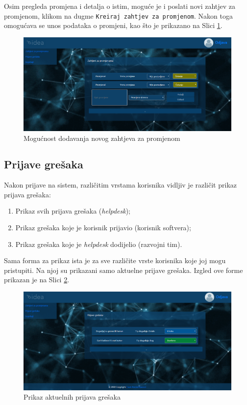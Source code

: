 \documentclass[12pt,a4paper]{article}
\begin{document}
Osim pregleda promjena i detalja o istim, moguće je i poslati novi zahtjev za promjenom, klikom na dugme \texttt{Kreiraj zahtjev za promjenom}. Nakon toga omogućava se unos podataka o promjeni, kao što je prikazano na Slici \ref{s10}.

\begin{figure}[H]
\center
\includegraphics[scale=0.35]{../res/UI/changeAdd.PNG}
\caption{Mogućnost dodavanja novog zahtjeva za promjenom}
\label{s10}
\end{figure}

\newpage

\subsection{Prijave grešaka}

Nakon prijave na sistem, različitim vrstama korisnika vidljiv je različit prikaz prijava grešaka:

\begin{enumerate}
\item Prikaz svih prijava grešaka (\textit{helpdesk});
\item Prikaz grešaka koje je korisnik prijavio (korisnik softvera);
\item Prikaz grešaka koje je \textit{helpdesk} dodijelio (razvojni tim).
\end{enumerate}

Sama forma za prikaz ista je za sve različite vrste korisnika koje joj mogu pristupiti. Na njoj su prikazani samo aktuelne prijave grešaka. Izgled ove forme prikazan je na Slici \ref{s11}.

\begin{figure}[H]
\center
\includegraphics[scale=0.35]{../res/UI/errorActual.PNG}
\caption{Prikaz aktuelnih prijava grešaka}
\label{s11}
\end{figure}
\end{document}

